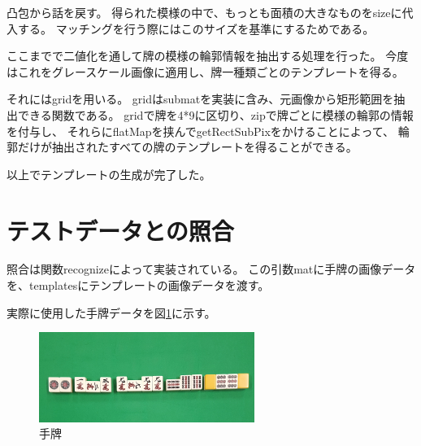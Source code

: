 \documentclass{jsarticle}
\begin{document}
\begin{multicols}{2}

凸包から話を戻す。
得られた模様の中で、もっとも面積の大きなものをsizeに代入する。
マッチングを行う際にはこのサイズを基準にするためである。

ここまでで二値化を通して牌の模様の輪郭情報を抽出する処理を行った。
今度はこれをグレースケール画像に適用し、牌一種類ごとのテンプレートを得る。

それにはgridを用いる。
gridはsubmatを実装に含み、元画像から矩形範囲を抽出できる関数である。
gridで牌を4*9に区切り、zipで牌ごとに模様の輪郭の情報を付与し、
それらにflatMapを挟んでgetRectSubPixをかけることによって、
輪郭だけが抽出されたすべての牌のテンプレートを得ることができる。

以上でテンプレートの生成が完了した。

\section{テストデータとの照合}

照合は関数recognizeによって実装されている。
この引数matに手牌の画像データを、templatesにテンプレートの画像データを渡す。

実際に使用した手牌データを図\ref{fig:hand}に示す。

\begin{figure}[H]
  \begin{center}
    \includegraphics[clip,width=7.0cm]{./img/hand.png}
    \caption{手牌}
    \label{fig:hand}
  \end{center}
\end{figure}


\end{multicols}
\end{document}
